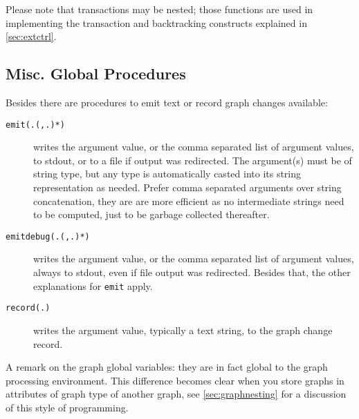 Please note that transactions may be nested; those functions are used in implementing the transaction and backtracking constructs explained in \ref{sec:extctrl}.


\subsection{Misc. Global Procedures}

Besides there are procedures to emit text or record graph changes available: 

\begin{description}
\item[\texttt{emit(.(,.)*)}] writes the argument value, or the comma separated list of argument values, to stdout, or to a file if output was redirected. The argument(s) must be of string type, but any type is automatically casted into its string representation as needed. Prefer comma separated arguments over string concatenation, they are are more efficient as no intermediate strings need to be computed, just to be garbage collected thereafter.
\item[\texttt{emitdebug(.(,.)*)}] writes the argument value, or the comma separated list of argument values, always to stdout, even if file output was redirected. Besides that, the other explanations for \texttt{emit} apply.
\item[\texttt{record(.)}] writes the argument value, typically a text string, to the graph change record.
\end{description}

A remark on the graph global variables: they are in fact global to the graph processing environment.
This difference becomes clear when you store graphs in attributes of graph type of another graph, see \ref{sec:graphnesting} for a discussion of this style of programming.


